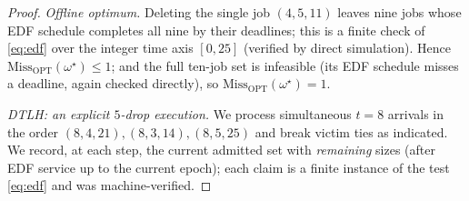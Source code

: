 \documentclass{amsart}
\theoremstyle{definition}
\begin{document}
\begin{proof}
\emph{Offline optimum.} Deleting the single job $(4,5,11)$ leaves nine jobs whose
EDF schedule completes all nine by their deadlines; this is a finite check of
\eqref{eq:edf} over the integer time axis $[0,25]$ (verified by direct
simulation). Hence $\mathrm{Miss}_{\mathrm{OPT}}(\omega^\star)\le1$; and the full
ten-job set is infeasible (its EDF schedule misses a deadline, again checked
directly), so $\mathrm{Miss}_{\mathrm{OPT}}(\omega^\star)=1$.

\emph{DTLH: an explicit $5$-drop execution.} We process simultaneous $t=8$
arrivals in the order $(8,4,21),(8,3,14),(8,5,25)$ and break victim ties as
indicated. We record, at each step, the current admitted set with
\emph{remaining} sizes (after EDF service up to the current epoch); each claim is
a finite instance of the test \eqref{eq:edf} and was machine-verified.


\end{proof}
\end{document}
